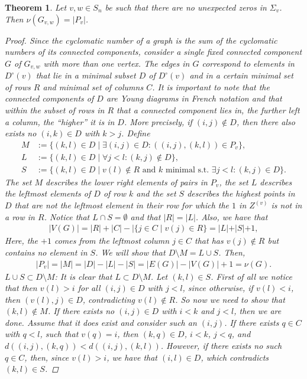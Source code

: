 \documentclass[11pt]{amsart}
\newtheorem{theorem}{Theorem}[section]
\theoremstyle{definition}
\theoremstyle{definition}
\theoremstyle{definition}
\theoremstyle{definition}
\newcommand{\Gvwt}{G_{v,w}}
\newcommand{\Dc}{D^{\circ}}
\newcommand{\cn}{\nu}
\begin{document}
\begin{theorem} \label{thm: cyclomatic number from pairs}
Let $v,w \in S_n$ be such that there are no unexpected zeros in  $\Sigma_v$. Then $ \cn(\Gvwt) = |P_v|$.
\begin{proof}
    Since the cyclomatic number of a graph is the sum of the cyclomatic numbers of its connected components, consider a single fixed connected component $G$ of $\Gvwt$ with more than one vertex. The edges in $G$ correspond to elements in $\Dc(v)$ that lie in a minimal subset $D$ of $\Dc(v)$ and in a certain minimal set of rows $R$ and minimal set of columns $C$. 
    It is important to note that the connected components of $D$ are {Young diagrams} in French notation and that within the subset of rows in $R$ that a connected component lies in, the further left a column, the ``higher'' it is in $D$. More precisely, if $(i,j)\not\in D$, then there also exists no $(i,k)\in D$ with $k>j$. 
    Define 
    \begin{align*}
        M & := \{ (k,l) \in D \mid \exists (i,j)\in D: ((i,j),(k,l))\in P_v \} ,\\
        L & := \{ (k,l) \in D \mid \forall j < l: (k,j) \not\in D \}, \\
        S & := \{ (k,l) \in D \mid v(l) \not\in R \text{ and } k \text{ minimal s.t. } \exists j<l: (k,j) \in D \}.
    \end{align*}
    The set $M$ describes the lower right elements of pairs in $P_v$, the set $L$ describes the leftmost elements of $D$ of row $k$ and the set $S$ describes the highest points in $D$ that are not the leftmost element in their row for which the $1$ in $Z^{(v)}$ is not in a row in $R$.
    Notice that $L \cap S = \emptyset$ and that $|R| = |L|$. Also, we have that  
    \begin{align*}
    |V(G)| = |R| + |C| - |\{ j \in C \mid v(j) \in R \} 
     = |L| + |S| + 1,    
    \end{align*}    
    Here, the $+1$ comes from the leftmost column $j \in C$ that has $v(j) \not\in R$ but contains no element in $S$.
    We will show that $D \setminus M = L \cup S$. Then,
    \begin{align*}
    |P_v| = |M| = |D| -|L| - |S| 
        = |E(G)| - |V(G)| +1 
         = \cn(G).
    \end{align*} 
\noindent    
\underline{$L \cup S \subset D \setminus M$}: It is clear that $L \subset D \setminus M$. Let $(k,l) \in S$. First of all we notice that then $v(l) >i$ for all $(i,j) \in D$ with $j <l$, since otherwise, if $v(l)<i$, then $(v(l),j)\in D$, contradicting $v(l) \not\in R$. So now we need to show that $(k,l) \not\in M$. If there exists no $(i,j)\in D$ with $i<k$ and $j<l$, then we are done. Assume that it does exist and consider such an $(i,j)$. %
If there exists $q \in C$ with $q < l$, such that $v(q) = i$, then $(k,q) \in D$, $i<k$, $j <q$, and $d((i,j),(k,q)) < d((i,j),(k,l))$. However, if there exists no such $q \in C$, then, since $v(l)>i$, we have that $(i,l)\in D$, which contradicts $(k,l) \in S$.


\end{proof}
\end{theorem}
\end{document}
